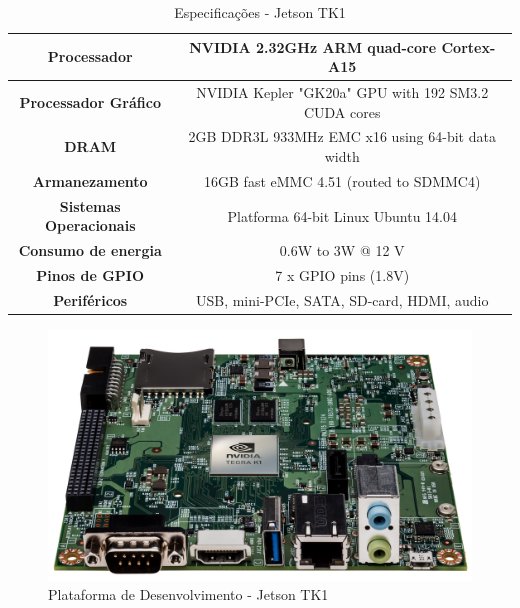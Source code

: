 \begin{table}[]
\centering
\caption{Especificações - Jetson TK1}
\label{jetson_tk1_tab}
\begin{tabular}{|c|c|}
\hline
\textbf{Processador}           & NVIDIA 2.32GHz ARM quad-core Cortex-A15              \\	\hline
\textbf{Processador Gráfico}   & NVIDIA Kepler "GK20a" GPU  with 192 SM3.2 CUDA cores \\	\hline
\textbf{DRAM}                  & 2GB DDR3L 933MHz EMC x16 using 64-bit data width     \\	\hline
\textbf{Armanezamento}         & 16GB fast eMMC 4.51 (routed to SDMMC4)               \\	\hline
\textbf{Sistemas Operacionais} & Platforma 64-bit Linux Ubuntu 14.04                  \\	\hline
\textbf{Consumo de energia}    & 0.6W to 3W @ 12 V                                    \\	\hline
\textbf{Pinos de GPIO}         & 7 x GPIO pins (1.8V)                                 \\	\hline
\textbf{Periféricos}           & USB, mini-PCIe, SATA, SD-card, HDMI, audio           \\	\hline
\end{tabular}
\end{table}

\begin{figure}[H]
	\centering
	\includegraphics[scale=0.10]{./Resources/jetson_tk1.jpg}
	\caption{Plataforma de Desenvolvimento - Jetson TK1}
	\label{jetson_tk1}
\end{figure}


